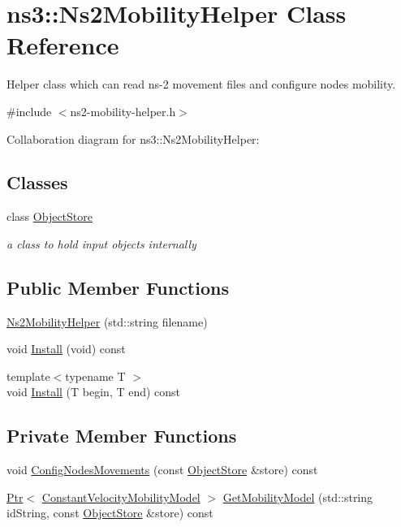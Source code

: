 \hypertarget{classns3_1_1Ns2MobilityHelper}{}\section{ns3\+:\+:Ns2\+Mobility\+Helper Class Reference}
\label{classns3_1_1Ns2MobilityHelper}


Helper class which can read ns-\/2 movement files and configure nodes mobility.  




{\ttfamily \#include $<$ns2-\/mobility-\/helper.\+h$>$}



Collaboration diagram for ns3\+:\+:Ns2\+Mobility\+Helper\+:
\subsection*{Classes}
\begin{DoxyCompactItemize}
\item 
class \hyperlink{classns3_1_1Ns2MobilityHelper_1_1ObjectStore}{Object\+Store}
\begin{DoxyCompactList}\small\item\em a class to hold input objects internally \end{DoxyCompactList}\end{DoxyCompactItemize}
\subsection*{Public Member Functions}
\begin{DoxyCompactItemize}
\item 
\hyperlink{classns3_1_1Ns2MobilityHelper_aafed6f99e77c1fc74192da4d54e0eae7}{Ns2\+Mobility\+Helper} (std\+::string filename)
\item 
void \hyperlink{classns3_1_1Ns2MobilityHelper_ae54f17492e3efd54ff7501566fc6e9cf}{Install} (void) const 
\item 
{\footnotesize template$<$typename T $>$ }\\void \hyperlink{classns3_1_1Ns2MobilityHelper_a0d22b6c0acc9cd93479fb2fafa692c14}{Install} (T begin, T end) const 
\end{DoxyCompactItemize}
\subsection*{Private Member Functions}
\begin{DoxyCompactItemize}
\item 
void \hyperlink{classns3_1_1Ns2MobilityHelper_a07ac38324875ef8cf45e9cd4669756dc}{Config\+Nodes\+Movements} (const \hyperlink{classns3_1_1Ns2MobilityHelper_1_1ObjectStore}{Object\+Store} \&store) const 
\item 
\hyperlink{classns3_1_1Ptr}{Ptr}$<$ \hyperlink{classns3_1_1ConstantVelocityMobilityModel}{Constant\+Velocity\+Mobility\+Model} $>$ \hyperlink{classns3_1_1Ns2MobilityHelper_a5787c916365033678d89a0f0aba8bac7}{Get\+Mobility\+Model} (std\+::string id\+String, const \hyperlink{classns3_1_1Ns2MobilityHelper_1_1ObjectStore}{Object\+Store} \&store) const 
\end{DoxyCompactItemize}
